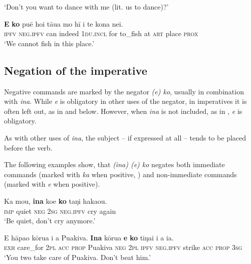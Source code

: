 \glt 
‘Don’t you want to dance with me (lit. us to dance)?’ \textstyleExampleref{[R315.115]} 
\z

\ea\label{ex:10.132}
\gll \textbf{E} \textbf{ko} puē ho{\ꞌ}i tāua mo hī {\ꞌ}i te kona nei. \\
\textsc{ipfv} \textsc{neg.ipfv} can indeed \textsc{1du.incl} for to\_fish at \textsc{art} place \textsc{prox} \\

\glt 
‘We cannot fish in this place.’ \textstyleExampleref{[R237.149]} 
\z

\subsection{Negation of the imperative}\label{sec:10.5.5}
Negative commands are marked by the  negator \textit{(e) ko}, usually in combination with \textit{{\ꞌ}ina}. While \textit{e} is obligatory in other uses of the  negator, in imperatives it is often left out, as in  and  below. However, when \textit{{\ꞌ}ina} is not included, as in , \textit{e} is obligatory.

As with other uses of \textit{{\ꞌ}ina}, the subject – if expressed at all – tends to be placed before the verb. 

The following examples show, that \textit{({\ꞌ}ina) (e) ko} negates both immediate commands (marked with \textit{ka} when positive, ) and non-immediate commands (marked with \textit{e} when positive).

\ea\label{ex:10.133}
\gll Ka mou, \textbf{{\ꞌ}ina} koe \textbf{ko} taŋi haka{\ꞌ}ou. \\
\textsc{imp} quiet \textsc{neg} \textsc{2sg} \textsc{neg.ipfv} cry again \\

\glt 
‘Be quiet, don’t cry anymore.’ \textstyleExampleref{[R229.343]} 
\z

\ea\label{ex:10.134}
\gll E hāpa{\ꞌ}o kōrua i a Puakiva. \textbf{{\ꞌ}Ina} kōrua \textbf{e} \textbf{ko} tiŋa{\ꞌ}i i a ia. \\
\textsc{exh} care\_for \textsc{2pl} \textsc{acc} \textsc{prop} Puakiva \textsc{neg} \textsc{2pl} \textsc{ipfv} \textsc{neg.ipfv} strike \textsc{acc} \textsc{prop} \textsc{3sg} \\

\glt 
‘You two take care of Puakiva. Don’t beat him.’ \textstyleExampleref{[R229.420]} 
\z


